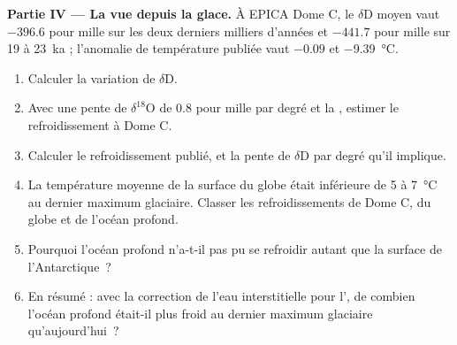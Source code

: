 \begin{problem}
\medskip\noindent\textbf{Partie IV --- La vue depuis la glace.}
À EPICA Dome C, le $\delta$D moyen vaut $-396.6$ pour mille sur les deux derniers milliers d'années et
$-441.7$ pour mille sur 19 à \qty{23}{ka} ; l'anomalie de température publiée vaut $-0.09$ et
\qty{-9.39}{\celsius}.
\begin{enumerate}[resume]
  \item Calculer la variation de $\delta$D.
  \item Avec une pente de $\delta^{18}$O de \num{0.8} pour mille par degré et la , estimer
        le refroidissement à Dome C.
  \item Calculer le refroidissement publié, et la pente de $\delta$D par degré qu'il implique.
  \item La température moyenne de la surface du globe était inférieure de 5 à \qty{7}{\celsius} au dernier maximum glaciaire.
        Classer les refroidissements de Dome C, du globe et de l'océan profond.
  \item Pourquoi l'océan profond n'a-t-il pas pu se refroidir autant que la surface de l'Antarctique~?
  \item En résumé : avec la correction de l'eau interstitielle pour l', de combien l'océan profond
        était-il plus froid au dernier maximum glaciaire qu'aujourd'hui~?
\end{enumerate}
\end{problem}
